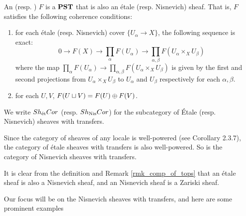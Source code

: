 \begin{defn}\label{def_etale_sheaf}\label{def_nis_sheaf}
An  (resp. ) $F$ is a $\mathbf{PST}$ that is also
an \'etale (resp. Nisnevich) sheaf. That is, $F$ satisfies the
following coherence conditions:
\begin{enumerate}
\item for each \'etale (resp. Nisnevich) cover $\{U_\alpha \to 
X\}$, the following sequence is exact:
\[
0 \to F(X) \to \prod_\alpha F(U_\alpha) \to \prod_{\alpha, \beta} 
   F(U_\alpha \times_X U_\beta)
\]
where the map $\prod_\alpha F(U_\alpha) \to \prod_{\alpha, \beta} 
F(U_\alpha \times_X U_\beta)$ is given by the first and second 
projections from $U_\alpha \times_X U_\beta$ to $U_\alpha$ and
$U_\beta$ respectively for each $\alpha, \beta$.

\item for each $U, V$, $F(U \sqcup V) = F(U) \oplus F(V)$.
\end{enumerate}

\noindent We write $Sh_{\mathrm{\acute{e}t}}Cor$ (resp. $Sh_{\mathrm{Nis}}Cor$) for the 
subcategory of \'Etale (resp. Nisnevich) sheaves with transfers.
\end{defn}

Since the category of sheaves of any locale is well-powered
(see \cite{Bo} Corollary 2.3.7), the category of \'etale sheaves 
with transfers is also well-powered. So is the category of 
Nisnevich sheaves with transfers.

\begin{rmk}
It is clear from the definition and Remark \ref{rmk_comp_of_tops}
that an \'etale sheaf is also a Nisnevich sheaf, and an Nisnevich
sheaf is a Zariski sheaf.
\end{rmk}

Our focus will be on the Nisnevich sheaves with transfers, and 
here are some prominent examples 

